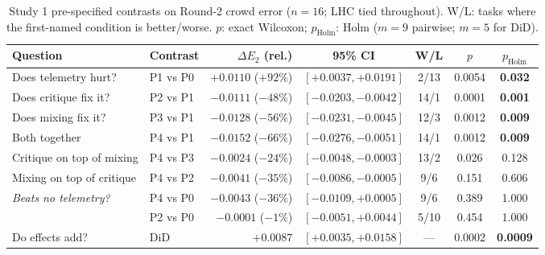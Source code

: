 \documentclass[10pt]{article}
\newenvironment{fittable}{\begin{lrbox}{\manuscripttable}}{%
\end{lrbox}\ifdim\wd\manuscripttable>\linewidth
\resizebox{\linewidth}{!}{\usebox{\manuscripttable}}%
\else\usebox{\manuscripttable}\fi}
\theoremstyle{manuscript}\newtheorem{proposition}{Proposition}
\newcommand{\pH}{p_{\text{Holm}}}
\begin{document}
\begin{table}[ht]\centering\small\setlength{\tabcolsep}{4pt}
\caption{Study 1 pre-specified contrasts on Round-2 crowd error ($n=16$; LHC tied throughout). W/L: tasks where the first-named condition is better/worse. $p$: exact Wilcoxon; $\pH$: Holm ($m=9$ pairwise; $m=5$ for DiD).}\label{tab:contrasts}
\begin{fittable}
\begin{tabular}{@{}llrcccc@{}}\toprule
Question & Contrast & $\Delta E_2$ (rel.) & 95\% CI & W/L & $p$ & $\pH$\\\midrule
Does telemetry hurt? & P1 vs P0 & $+0.0110$ ($+92\%$) & $[+0.0037,+0.0191]$ & 2/13 & 0.0054 & \textbf{0.032}\\
Does critique fix it? & P2 vs P1 & $-0.0111$ ($-48\%$) & $[-0.0203,-0.0042]$ & 14/1 & 0.0001 & \textbf{0.001}\\
Does mixing fix it? & P3 vs P1 & $-0.0128$ ($-56\%$) & $[-0.0231,-0.0045]$ & 12/3 & 0.0012 & \textbf{0.009}\\
Both together & P4 vs P1 & $-0.0152$ ($-66\%$) & $[-0.0276,-0.0051]$ & 14/1 & 0.0012 & \textbf{0.009}\\
Critique on top of mixing & P4 vs P3 & $-0.0024$ ($-24\%$) & $[-0.0048,-0.0003]$ & 13/2 & 0.026 & 0.128\\
Mixing on top of critique & P4 vs P2 & $-0.0041$ ($-35\%$) & $[-0.0086,-0.0005]$ & 9/6 & 0.151 & 0.606\\
\emph{Beats no telemetry?} & P4 vs P0 & $-0.0043$ ($-36\%$) & $[-0.0109,+0.0005]$ & 9/6 & 0.389 & 1.000\\
& P2 vs P0 & $-0.0001$ ($-1\%$) & $[-0.0051,+0.0044]$ & 5/10 & 0.454 & 1.000\\\midrule
Do effects add? & DiD & $+0.0087$ & $[+0.0035,+0.0158]$ & --- & 0.0002 & \textbf{0.0009}\\\bottomrule
\end{tabular}
\end{fittable}
\end{table}

\FloatBarrier
\clearpage
\end{document}
